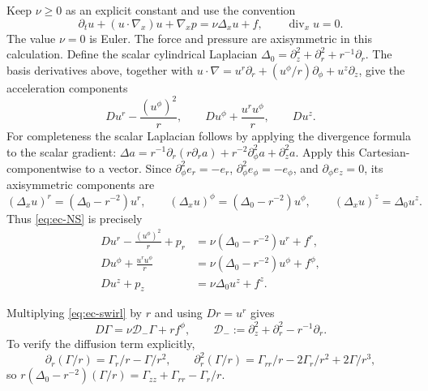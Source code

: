 Keep \(\nu\geq0\) as an explicit constant and use the convention
\begin{equation}
 \partial_tu+(u\cdot\nabla_x)u+\nabla_xp
      =\nu\Delta_xu+f,\qquad \operatorname{div}_xu=0.
 \label{eq:ec-NS}
\end{equation}
The value \(\nu=0\) is Euler.  The force and pressure are axisymmetric
in this calculation.  Define the scalar cylindrical Laplacian
\(\Delta_0=\partial_z^2+\partial_r^2+r^{-1}\partial_r\).
The basis derivatives above, together with
\(u\cdot\nabla=u^r\partial_r+(u^\phi/r)\partial_\phi+u^z\partial_z\),
give the acceleration components
\[
 D u^r-\frac{(u^\phi)^2}{r},\qquad
 D u^\phi+\frac{u^r u^\phi}{r},\qquad D u^z.
\]
For completeness the scalar Laplacian follows by applying the divergence
formula to the scalar gradient:
\(\Delta a=r^{-1}\partial_r(r\partial_ra)
+r^{-2}\partial_\phi^2a+\partial_z^2a\).
Apply this Cartesian-componentwise to a vector.  Since
\(\partial_\phi^2e_r=-e_r\),
\(\partial_\phi^2e_\phi=-e_\phi\), and
\(\partial_\phi e_z=0\), its axisymmetric components are
\[
 (\Delta_xu)^r=(\Delta_0-r^{-2})u^r,\qquad
 (\Delta_xu)^\phi=(\Delta_0-r^{-2})u^\phi,
 \qquad (\Delta_xu)^z=\Delta_0u^z.
\]
Thus \eqref{eq:ec-NS} is precisely
\begin{align}
 D u^r-\frac{(u^\phi)^2}{r}+p_r
       &=\nu(\Delta_0-r^{-2})u^r+f^r,\label{eq:ec-radial}\\
 D u^\phi+\frac{u^r u^\phi}{r}
       &=\nu(\Delta_0-r^{-2})u^\phi+f^\phi,\label{eq:ec-swirl}\\
 D u^z+p_z&=\nu\Delta_0u^z+f^z.\label{eq:ec-axial}
\end{align}

Multiplying \eqref{eq:ec-swirl} by \(r\) and using \(Dr=u^r\) gives
\begin{equation}
 D\Gamma=\nu\mathcal D_-\Gamma+rf^\phi,
 \qquad \mathcal D_-:=\partial_z^2+\partial_r^2-r^{-1}\partial_r.
 \label{eq:ec-Gamma-physical}
\end{equation}
To verify the diffusion term explicitly,
\[
 \partial_r(\Gamma/r)=\Gamma_r/r-\Gamma/r^2,\qquad
 \partial_r^2(\Gamma/r)=\Gamma_{rr}/r-2\Gamma_r/r^2+2\Gamma/r^3,
\]
so \(r(\Delta_0-r^{-2})(\Gamma/r)
=\Gamma_{zz}+\Gamma_{rr}-\Gamma_r/r\).

